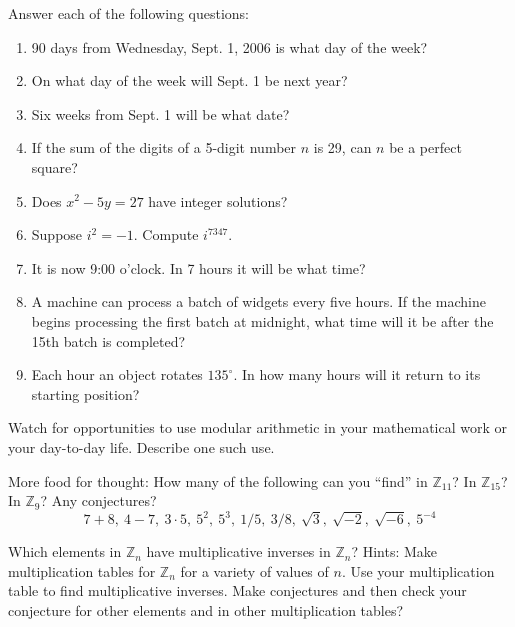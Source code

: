 \documentclass[space,nooutcomes,handout]{ximera}
\begin{document}
\begin{problem}
Answer each of the following questions: 
\begin{enumerate}
\item 90 days from Wednesday, Sept. 1, 2006 is what day of the week?
\item On what day of the week will Sept. 1 be next year?
\item Six weeks from Sept. 1 will be what date?
\item If the sum of the digits of a 5-digit number $n$ is 29, can $n$ be a perfect square?
\item Does $x^2 - 5y = 27$ have integer solutions?
\item Suppose $i^2 = -1$.  Compute $i^{7347}$.
\item It is now 9:00 o'clock.  In 7 hours it will be what time?
\item A machine can process a batch of widgets every five hours.  If the machine begins processing the first batch at midnight, what time will it be after the 15th batch is completed?
\item Each hour an object rotates $135^\circ$.  In how many hours will it return to its starting position?  
\end{enumerate}
\begin{freeResponse}
\end{freeResponse}
\end{problem}

\begin{problem}
Watch for opportunities to use modular arithmetic in your mathematical work or your day-to-day life.  Describe one such use.
\begin{freeResponse}
\end{freeResponse}
\end{problem}

\begin{problem}
More food for thought:  How many of the following can you ``find'' in $\mathbb{Z}_{11}$? In $\mathbb{Z}_{15}$? In $\mathbb{Z}_9$?  Any conjectures? 
\[
7 + 8,\ 4 - 7,\ 3\cdot 5,\ 5^2,\ 5^3,\ 1/5,\ 3/8,\ \sqrt{3},\ \sqrt{-2},\ \sqrt{-6},\ 5^{-4} 
\]
\begin{freeResponse}
\end{freeResponse}
\end{problem}

\begin{problem}
Which elements in $\mathbb{Z}_n$ have multiplicative inverses in $\mathbb{Z}_n$?  
Hints:  Make multiplication tables for $\mathbb{Z}_n$ for a variety of values of $n$.   Use your multiplication table to find multiplicative inverses.  Make conjectures and then check your conjecture for other elements and in other multiplication tables? 
\begin{freeResponse}
\end{freeResponse}
\end{problem}
\end{document}

